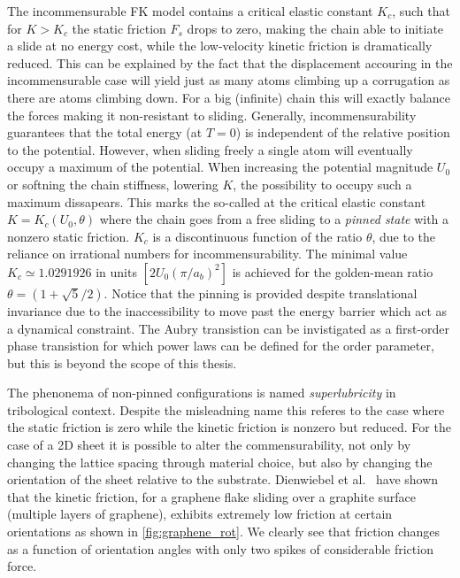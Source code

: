 The incommensurable \acrshort{FK} model contains a critical elastic constant $K_c$, such
that for $K > K_c$ the static friction $F_s$ drops to zero, making the chain able to initiate a slide at no energy cost, while the low-velocity kinetic friction is dramatically reduced. This can be explained by the
fact that the displacement accouring in the incommensurable case will yield just
as many atoms climbing up a corrugation as there are atoms climbing down. For a big (infinite) chain this will exactly balance the forces making it
non-resistant to sliding. Generally, incommensurability guarantees that the
total energy (at $T=0$) is independent of the relative position to the
potential. However, when sliding freely a single atom will eventually occupy a
maximum of the potential. When increasing the potential magnitude $U_0$ or
softning the chain stiffness, lowering $K$, the possibility to occupy such a
maximum dissapears. This marks the so-called 
at the critical elastic constant $K = K_c(U_0, \theta)$ where the chain goes
from a free sliding to a \textit{pinned state} with a nonzero static friction.
$K_c$ is a discontinuous function of the ratio $\theta$, due to the reliance on
irrational numbers for incommensurability. The minimal
value $K_c \simeq 1.0291926 $ in units $[2 U_0 (\pi / a_b)^2]$ is achieved for
the golden-mean ratio $\theta = (1+\sqrt{5}/2)$. Notice that the pinning is
provided despite translational invariance due to the inaccessibility to move
past the energy barrier which act as a dynamical constraint. The Aubry transistion
can be invistigated as a first-order phase transistion for which power laws can be
defined for the order parameter, but this is beyond the scope of this thesis.

The phenonema of non-pinned configurations is named \textit{superlubricity} in
tribological context. Despite the misleadning name this referes to the case
where the static friction is zero while the kinetic friction is nonzero but
reduced. For the case of a 2D sheet it is possible to alter the commensurability, not only by changing the lattice spacing through material choice, but also
by changing the orientation of the sheet relative to the substrate. Dienwiebel et al.\ \cite{DIENWIEBEL2005197} have shown that the kinetic friction, for a graphene flake sliding over a graphite surface (multiple layers of graphene), exhibits extremely low friction at certain orientations as shown in \cref{fig:graphene_rot}. We clearly see that friction changes as a function of orientation angles with only two spikes of considerable friction force.


